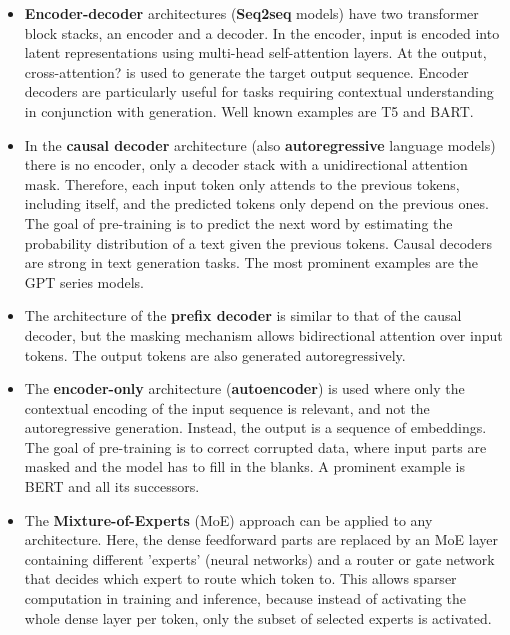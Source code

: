 \documentclass{article}
\begin{document}
\begin{itemize}
	\item \textbf{Encoder-decoder} architectures (\textbf{Seq2seq} models) have two transformer block stacks, an encoder and a decoder. In the encoder, input is encoded into latent representations using multi-head self-attention layers. At the output, cross-attention? is used to generate the target output sequence. Encoder decoders are particularly useful for tasks requiring contextual understanding in conjunction with generation. Well known examples are T5 and BART.
	\item In the \textbf{causal decoder} architecture (also \textbf{autoregressive} language models) there is no encoder, only a decoder stack with a unidirectional attention mask. Therefore, each input token only attends to the previous tokens, including itself, and the predicted tokens only depend on the previous ones. The goal of pre-training is to predict the next word by estimating the probability distribution of a text given the previous tokens. Causal decoders are strong in text generation tasks. The most prominent examples are the GPT series models.
	\item The architecture of the \textbf{prefix decoder} is similar to that of the causal decoder, but the masking mechanism allows bidirectional attention over input tokens. The output tokens are also generated autoregressively.
	\item The \textbf{encoder-only} architecture (\textbf{autoencoder}) is used where only the contextual encoding of the input sequence is relevant, and not the autoregressive generation. Instead, the output is a sequence of embeddings. The goal of pre-training is to correct corrupted data, where input parts are masked and the model has to fill in the blanks. A prominent example is BERT and all its successors.
	\item The \textbf{Mixture-of-Experts} (MoE) approach can be applied to any architecture. Here, the dense feedforward parts are replaced by an MoE layer containing different 'experts' (neural networks) and a router or gate network that decides which expert to route which token to. This allows sparser computation in training and inference, because instead of activating the whole dense layer per token, only the subset of selected experts is activated.
\end{itemize}


\end{document}
